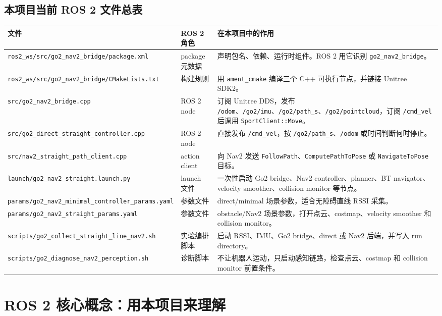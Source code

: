 \documentclass[UTF8,11pt,a4paper,openany]{ctexrep}
\newcommand{\code}[1]{\nolinkurl{#1}}
\newcommand{\file}[1]{\nolinkurl{#1}}
\newcommand{\pkg}[1]{\nolinkurl{#1}}
\newcommand{\topic}[1]{\nolinkurl{#1}}
\newcommand{\actionname}[1]{\nolinkurl{#1}}
\begin{document}
\section{本项目当前 ROS 2 文件总表}

\begin{longtable}{L{0.30\textwidth} L{0.25\textwidth} L{0.36\textwidth}}
\toprule
\textbf{文件} & \textbf{ROS 2 角色} & \textbf{在本项目中的作用} \\
\midrule
\endhead
\file{ros2_ws/src/go2_nav2_bridge/package.xml}
& package 元数据
& 声明包名、依赖、运行时组件。ROS 2 用它识别 \pkg{go2_nav2_bridge}。\\
\file{ros2_ws/src/go2_nav2_bridge/CMakeLists.txt}
& 构建规则
& 用 \code{ament_cmake} 编译三个 C++ 可执行节点，并链接 Unitree SDK2。\\
\file{src/go2_nav2_bridge.cpp}
& ROS 2 node
& 订阅 Unitree DDS，发布 \topic{/odom}、\topic{/go2/imu}、\topic{/go2/path_s}、\topic{/go2/pointcloud}，订阅 \topic{/cmd_vel} 后调用 \code{SportClient::Move}。\\
\file{src/go2_direct_straight_controller.cpp}
& ROS 2 node
& 直接发布 \topic{/cmd_vel}，按 \topic{/go2/path_s}、\topic{/odom} 或时间判断何时停止。\\
\file{src/nav2_straight_path_client.cpp}
& action client
& 向 Nav2 发送 \actionname{FollowPath}、\actionname{ComputePathToPose} 或 \actionname{NavigateToPose} 目标。\\
\file{launch/go2_nav2_straight.launch.py}
& launch 文件
& 一次性启动 Go2 bridge、Nav2 controller、planner、BT navigator、velocity smoother、collision monitor 等节点。\\
\file{params/go2_nav2_minimal_controller_params.yaml}
& 参数文件
& direct/minimal 场景参数，适合无障碍直线 RSSI 采集。\\
\file{params/go2_nav2_straight_params.yaml}
& 参数文件
& obstacle/Nav2 场景参数，打开点云、costmap、velocity smoother 和 collision monitor。\\
\file{scripts/go2_collect_straight_line_nav2.sh}
& 实验编排脚本
& 启动 RSSI、IMU、Go2 bridge、direct 或 Nav2 后端，并写入 run directory。\\
\file{scripts/go2_diagnose_nav2_perception.sh}
& 诊断脚本
& 不让机器人运动，只启动感知链路，检查点云、costmap 和 collision monitor 前置条件。\\
\bottomrule
\end{longtable}

\chapter{ROS 2 核心概念：用本项目来理解}
\label{chap:core}
\end{document}
